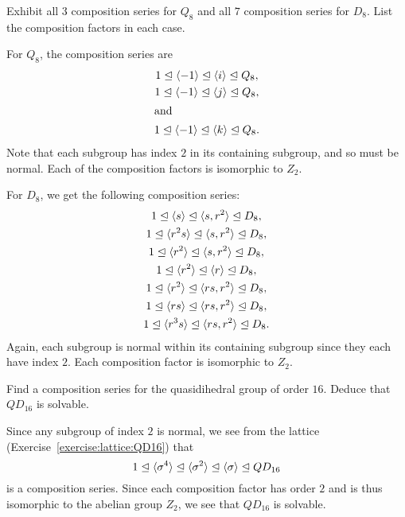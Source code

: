  Exhibit all $3$ composition series for $Q_8$ and all $7$
composition series for $D_8$. List the composition factors in each
case.
\begin{solution}
  For $Q_8$, the composition series are
  \begin{gather*}
    1 \trianglelefteq \langle{-1}\rangle
    \trianglelefteq \langle{i}\rangle
    \trianglelefteq Q_8, \\
    1 \trianglelefteq \langle{-1}\rangle
    \trianglelefteq \langle{j}\rangle
    \trianglelefteq Q_8, \\
    \intertext{and}
    1 \trianglelefteq \langle{-1}\rangle
    \trianglelefteq \langle{k}\rangle
    \trianglelefteq Q_8.
  \end{gather*}
  Note that each subgroup has index $2$ in its containing subgroup,
  and so must be normal. Each of the composition factors is isomorphic
  to $Z_2$.

  For $D_8$, we get the following composition series:
  \begin{gather*}
    1 \trianglelefteq \langle{s}\rangle
    \trianglelefteq \langle{s,r^2}\rangle
    \trianglelefteq D_8, \\
    1 \trianglelefteq \langle{r^2s}\rangle
    \trianglelefteq \langle{s,r^2}\rangle
    \trianglelefteq D_8, \\
    1 \trianglelefteq \langle{r^2}\rangle
    \trianglelefteq \langle{s,r^2}\rangle
    \trianglelefteq D_8, \\
    1 \trianglelefteq \langle{r^2}\rangle
    \trianglelefteq \langle{r}\rangle
    \trianglelefteq D_8, \\
    1 \trianglelefteq \langle{r^2}\rangle
    \trianglelefteq \langle{rs,r^2}\rangle
    \trianglelefteq D_8, \\
    1 \trianglelefteq \langle{rs}\rangle
    \trianglelefteq \langle{rs,r^2}\rangle
    \trianglelefteq D_8, \\
    1 \trianglelefteq \langle{r^3s}\rangle
    \trianglelefteq \langle{rs,r^2}\rangle
    \trianglelefteq D_8.
  \end{gather*}
  Again, each subgroup is normal within its containing subgroup since
  they each have index $2$. Each composition factor is isomorphic to
  $Z_2$.
\end{solution}

 Find a composition series for the quasidihedral group of
order $16$. Deduce that $QD_{16}$ is solvable.
\begin{solution}
  Since any subgroup of index $2$ is normal, we see from the lattice
  (Exercise~\ref{exercise:lattice:QD16}) that
  \begin{equation*}
    1 \trianglelefteq \langle{\sigma^4}\rangle
    \trianglelefteq \langle{\sigma^2}\rangle
    \trianglelefteq \langle{\sigma}\rangle
    \trianglelefteq QD_{16}
  \end{equation*}
  is a composition series. Since each composition factor has order $2$
  and is thus isomorphic to the abelian group $Z_2$, we see that
  $QD_{16}$ is solvable.
\end{solution}
